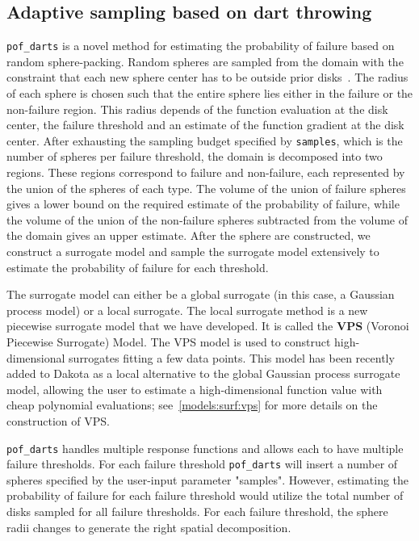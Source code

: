\subsection{Adaptive sampling based on dart throwing}\label{uq:adaptive:darts}
\texttt{pof\_darts} is a novel method for estimating the probability of failure based on random sphere-packing. Random spheres are sampled from the domain with the constraint that each new sphere center has to be outside prior disks~\cite{Ebeida14}. The radius of each sphere is chosen such that the entire sphere lies either in the failure or the non-failure region. This radius depends of the function evaluation at the disk center, the failure threshold and an estimate of the function gradient at the disk center. 
After exhausting the sampling budget specified by \texttt{samples}, which is the number of spheres per failure threshold, the domain is decomposed into two regions.  These regions correspond to failure and non-failure, each represented by the union of the spheres of each type. The volume of the union of failure spheres gives a lower bound on the required estimate of the probability of failure, while the volume of the union of the non-failure spheres subtracted from the volume of the domain gives an upper estimate. 
After the sphere are constructed, we construct a surrogate model and sample the surrogate model extensively to estimate the probability of failure for each threshold. 

The surrogate model can either be a global surrogate (in this case, a Gaussian process model) or a local surrogate. The local surrogate method is a new piecewise surrogate model that we have developed.  It is called the \textbf{VPS} (Voronoi Piecewise Surrogate) Model.  The VPS model is used to construct high-dimensional surrogates fitting a few data points. This model has been recently added to Dakota as a local alternative to the global Gaussian process surrogate model, allowing the user to estimate a high-dimensional function value with cheap polynomial evaluations; see~\ref{models:surf:vps} for more details on the construction of VPS.

\texttt{pof\_darts} handles multiple response functions and allows each to have multiple failure thresholds. For each failure threshold \texttt{pof\_darts} will insert a number of spheres specified by the user-input parameter "samples". However, estimating the probability of failure for each failure threshold would utilize the total number of disks sampled for all failure thresholds. For each failure threshold, the sphere radii changes to generate the right spatial decomposition.


